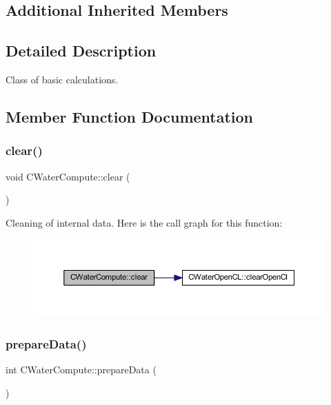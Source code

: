 \subsection*{Additional Inherited Members}


\subsection{Detailed Description}
Class of basic calculations. 

\subsection{Member Function Documentation}
\mbox{\label{class_c_water_compute_a6afba6407dd75a22e2beeac9472fdf6c}} 
\subsubsection{\texorpdfstring{clear()}{clear()}}
{\footnotesize\ttfamily void C\+Water\+Compute\+::clear (\begin{DoxyParamCaption}{ }\end{DoxyParamCaption})}

Cleaning of internal data. Here is the call graph for this function\+:
\nopagebreak
\begin{figure}[H]
\begin{center}
\leavevmode
\includegraphics[width=350pt]{class_c_water_compute_a6afba6407dd75a22e2beeac9472fdf6c_cgraph}
\end{center}
\end{figure}
\mbox{\label{class_c_water_compute_a5486835df389547dea8403401738c071}} 
\subsubsection{\texorpdfstring{prepare\+Data()}{prepareData()}}
{\footnotesize\ttfamily int C\+Water\+Compute\+::prepare\+Data (\begin{DoxyParamCaption}{ }\end{DoxyParamCaption})}

